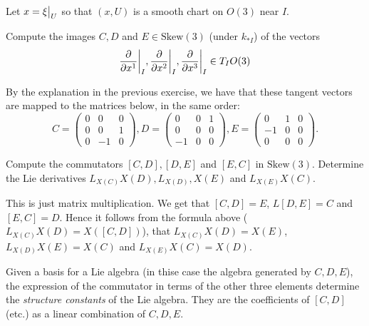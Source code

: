\documentclass[11pt, english]{article}
\begin{document}
Let $x=\restr{\xi}{U}$ so that $(x,U)$ is a smooth chart on $O(3)$ near $I$.
\begin{exc}
  Compute the images $C,D$ and $E \in \mathrm{Skew}(3)$ (under $k_{\ast I}$) of the vectors 
\[
\restr{\dd{}{x^1}}{I},\restr{\dd{}{x^2}}{I},\restr{\dd{}{x^3}}{I} \in T_IO(3)
\]
\end{exc}
\begin{sol}
  By the explanation in the previous exercise, we have that these tangent vectors are mapped to the matrices below, in the same order:
\[
C = \begin{pmatrix}
0 & 0 & 0 \\
0 & 0 & 1 \\
0 & -1 & 0
\end{pmatrix},
D = \begin{pmatrix}
0 & 0 & 1 \\
0 & 0 & 0 \\
-1 & 0 & 0
\end{pmatrix},
E = \begin{pmatrix}
0 & 1 & 0 \\
-1& 0 & 0 \\
0 & 0 & 0
\end{pmatrix}.
\]
\end{sol}

\begin{exc}
  Compute the commutators $[C,D],[D,E]$ and $[E,C]$ in $\mathrm{Skew}(3)$. Determine the Lie derivatives $L_{X(C)}X(D), L_{X(D)},X(E)$ and $L_{X(E)}X(C)$.
\end{exc}
\begin{sol}
This is just matrix multiplication. We get that $[C,D]=E$, $L[D,E]=C$ and $[E,C] = D$. Hence it follows from the formula above ($L_{X(C)}X(D) = X([C,D])$), that $L_{X(C)}X(D)=X(E)$, $L_{X(D)}X(E)=X(C)$ and $L_{X(E)}X(C)=X(D)$. 
\end{sol}

\begin{remark}
Given a basis for a Lie algebra (in thise case the algebra generated by $C,D,E$), the expression of the commutator in terms of the other three elements determine the \emph{structure constants} of the Lie algebra. They are the coefficients of $[C,D]$ (etc.) as a linear combination of $C,D,E$. 
\end{remark}
\end{document}
